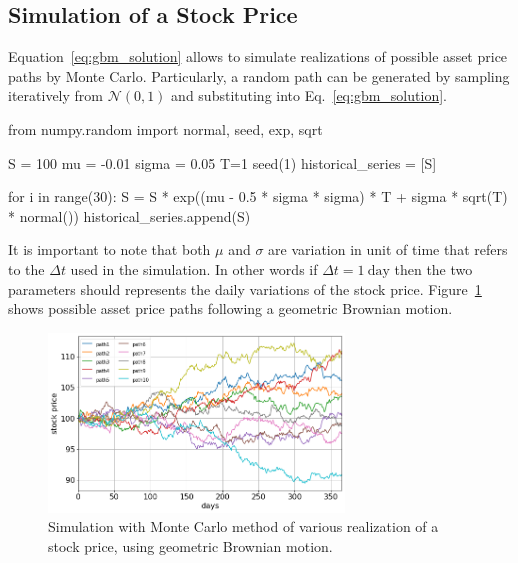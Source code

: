 \subsection{Simulation of a Stock Price}

Equation~\ref{eq:gbm_solution} allows to simulate realizations of possible asset price paths by Monte Carlo. Particularly, a random path can be generated by sampling iteratively from $\mathcal{N}(0,1)$ and substituting into Eq.~\ref{eq:gbm_solution}. 

\begin{ipython}
from numpy.random import normal, seed, exp, sqrt

S = 100
mu = -0.01
sigma = 0.05
T=1
seed(1)
historical_series = [S]

for i in range(30):
    S = S * exp((mu - 0.5 * sigma * sigma) * T +
                 sigma * sqrt(T) * normal())
    historical_series.append(S)
\end{ipython}

It is important to note that both $\mu$ and $\sigma$ are variation in unit of time that refers to the $\Delta t$ used in the simulation. In other words if $\Delta t = 1~\textrm{day}$ then the two parameters should represents the daily variations of the stock price. Figure~\ref{fig:stock_price_sim} shows possible asset price paths following a geometric Brownian motion. 

\begin{figure}[htb]
\centering
\includegraphics[width=0.7\textwidth]{figures/asset_price_simulation}
\caption{Simulation with Monte Carlo method of various realization of a stock price, using geometric Brownian motion.}
\label{fig:stock_price_sim}
\end{figure}

